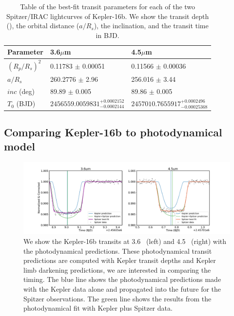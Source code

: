 \begin{table}
    \caption{Table of the best-fit transit parameters for each of the two Spitzer/IRAC lightcurves of Kepler-16b. We show the transit depth (\rprss), the orbital distance ($a/R_s$), the inclination, and the transit time in BJD.}

    \centering
    \begin{tabular}{lll}
    \hline \hline
    Parameter & 3.6$\mu$m & 4.5$\mu$m \\
    \hline
    $(R_p/R_s)^2$ &  0.11783 $\pm$ 0.00051 & 0.11566 $\pm$ 0.00036 \\
    $a/R_s$ & 260.2776 $\pm$ 2.96 & 256.016 $\pm$ 3.44   \\
    $inc$ (deg)  & 89.89 $\pm$ 0.005 & 89.86 $\pm$ 0.005 \\
    $T_0$ (BJD) &  $2456559.0059831^{+0.0002152}_{-0.0002144}$ &  $2457010.7655917^{+0.0002496}_{-0.00025368}$ \\
    \hline
    \end{tabular}
    \label{P4:tab:spitzerresults}
\end{table}

\subsection{Comparing Kepler-16b to photodynamical model}


\begin{figure}
    \centering
    \includegraphics[trim={1cm 0 1cm 0},clip, width=\linewidth]{Kepler16b_bestfit+pred+data.pdf}
    \caption{We show the Kepler-16b transits at 3.6\um~ (left) and 4.5\um~ (right) with the photodynamical predictions. These photodynamical transit predictions are computed with Kepler transit depths and Kepler limb darkening predictions, we are interested in comparing the timing. The blue line shows the photodynamical predictions made with the Kepler data alone and propagated into the future for the Spitzer observations. The green line shows the results from the photodynamical fit with Kepler plus Spitzer data. }
    \label{P4:fig:K16_photo}
\end{figure}

